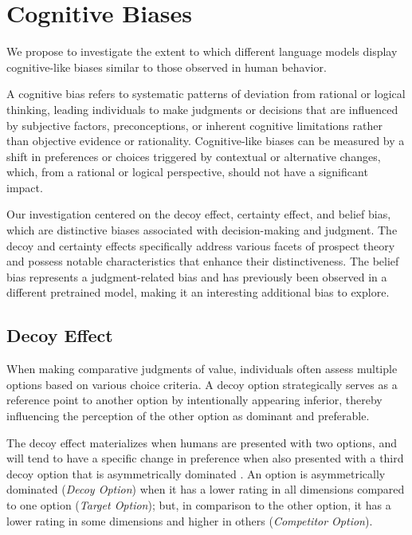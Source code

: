 \section{Cognitive Biases}\label{sec:cog_biases}
We propose to investigate the extent to which different language models display cognitive-like biases similar to those observed in human behavior.

A cognitive bias refers to systematic patterns of deviation from rational or logical thinking, leading individuals to make judgments or decisions that are influenced by subjective factors, preconceptions, or inherent cognitive limitations rather than objective evidence or rationality.
Cognitive-like biases can be measured by a shift in preferences or choices triggered by contextual or alternative changes, which, from a rational or logical perspective, should not have a significant impact.


Our investigation centered on the decoy effect, certainty effect, and belief bias, which are distinctive biases associated with decision-making and judgment.
The decoy and certainty effects specifically address various facets of prospect theory and possess notable characteristics that enhance their distinctiveness.
The belief bias represents a judgment-related bias and has previously been observed in a different pretrained model, making it an interesting additional bias to explore.


\subsection{Decoy Effect}
When making comparative judgments of value, individuals often assess multiple options based on various choice criteria.
A decoy option strategically serves as a reference point to another option by intentionally appearing inferior, thereby influencing the perception of the other option as dominant and preferable.

The decoy effect materializes when humans are presented with two options, and will tend to have a specific change in preference when also presented with a third decoy option that is asymmetrically dominated \cite{Huber1981AddingAD}.
An option is asymmetrically dominated (\textit{Decoy Option}) when it has a lower rating in all dimensions compared to one option (\textit{Target Option}); but, in comparison to the other option, it has a lower rating in some dimensions and higher in others (\textit{Competitor Option}).

